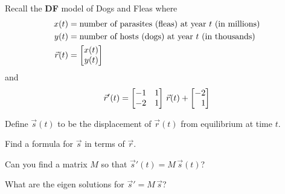 \documentclass{workbook}
\begin{document}
\begin{slide}
	\question
 		Recall the \textbf{DF} model of Dogs and Fleas where 
	\begin{align*}
		x(t) &= \text{number of parasites (fleas) at year $t$ (in millions)}\\
		y(t) &= \text{number of hosts (dogs) at year $t$ (in thousands)}\\
		\vec r(t) &= \mat{x(t)\\y(t)}
	\end{align*}
	and
	\[
		\vec r'(t) = \mat{-1&1\\-2&1}\,\vec r(t) + \mat{-2\\1}
	\]
	
	Define $\vec s(t)$ to be the displacement of $\vec r(t)$ from equilibrium at time $t$.
	\begin{parts}
		\item Find a formula for $\vec s$ in terms of $\vec r$.
		\item Can you find a matrix $M$ so that $\vec s'(t) = M\,\vec s(t)$?
		\item What are the eigen solutions for $\vec s'=M\,\vec s$?
	\end{parts}
\end{slide}
\end{document}
